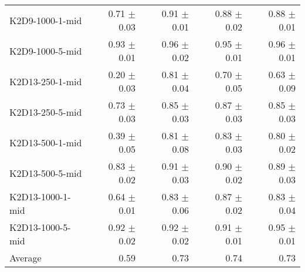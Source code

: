 \begin{table}[ht]
\begin{center}
\begin{small}
\begin{adjustbox}{max width=\columnwidth}
\begin{tabular}{l|rrrr}
K2D9-1000-1-mid & 0.71 $\pm$ 0.03 & 0.91 $\pm$ 0.01 & 0.88 $\pm$ 0.02 & 0.88 $\pm$ 0.01\\
K2D9-1000-5-mid & 0.93 $\pm$ 0.01 & 0.96 $\pm$ 0.02 & 0.95 $\pm$ 0.01 & 0.96 $\pm$ 0.01\\
K2D13-250-1-mid & 0.20 $\pm$ 0.03 & 0.81 $\pm$ 0.04 & 0.70 $\pm$ 0.05 & 0.63 $\pm$ 0.09\\
K2D13-250-5-mid & 0.73 $\pm$ 0.03 & 0.85 $\pm$ 0.03 & 0.87 $\pm$ 0.03 & 0.85 $\pm$ 0.03\\
K2D13-500-1-mid & 0.39 $\pm$ 0.05 & 0.81 $\pm$ 0.08 & 0.83 $\pm$ 0.03 & 0.80 $\pm$ 0.02\\
K2D13-500-5-mid & 0.83 $\pm$ 0.02 & 0.91 $\pm$ 0.03 & 0.90 $\pm$ 0.02 & 0.89 $\pm$ 0.03\\
K2D13-1000-1-mid & 0.64 $\pm$ 0.01 & 0.83 $\pm$ 0.06 & 0.87 $\pm$ 0.02 & 0.83 $\pm$ 0.04\\
K2D13-1000-5-mid & 0.92 $\pm$ 0.02 & 0.92 $\pm$ 0.02 & 0.91 $\pm$ 0.01 & 0.95 $\pm$ 0.01\\
\midrule
Average & 0.59 & 0.73 & 0.74 & 0.73\\
\end{tabular}
        \end{adjustbox}
    \end{small}
    \end{center}
    \vskip -0.1in
\end{table}
    